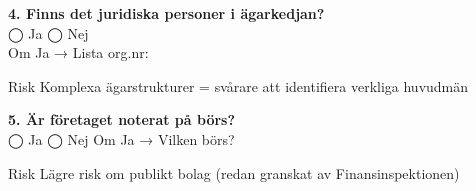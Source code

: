 \documentclass[10pt]{beamer}
\begin{document}
\begin{frame}[label=riskfragor-steg5]
  \vspace{0.3cm}

  \textbf{4. Finns det juridiska personer i ägarkedjan?}\\
  ◯ Ja \hspace{0.5cm} ◯ Nej\\
  Om Ja → Lista org.nr: \underline{\hspace{6cm}}
  \begin{block}{Risk}
    \tiny Komplexa ägarstrukturer = svårare att identifiera verkliga huvudmän
  \end{block}

  \vspace{0.3cm}

  \textbf{5. Är företaget noterat på börs?}\\
  ◯ Ja \hspace{0.5cm} ◯ Nej \hspace{0.5cm} Om Ja → Vilken börs? \underline{\hspace{3cm}}
  \begin{block}{Risk}
    \tiny Lägre risk om publikt bolag (redan granskat av Finansinspektionen)
  \end{block}

  \vspace{0.5cm}
  \begin{flushright}
    \hyperlink{riskfragor-steg4}{} \hspace{0.3cm} \hyperlink{identitetskontroll}{}
  \end{flushright}
\end{frame}
\end{document}
